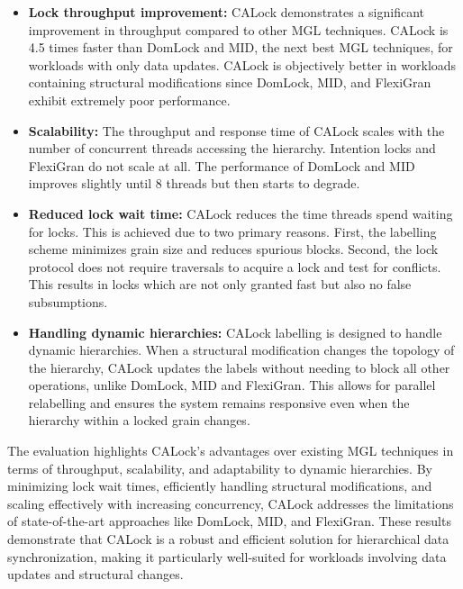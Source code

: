 \begin{itemize}
    \item \textbf{Lock throughput improvement:} CALock demonstrates a significant improvement in throughput compared to other MGL techniques. CALock is 4.5 times faster than DomLock and MID, the next best MGL techniques, for workloads with only data updates. CALock is objectively better in workloads containing structural modifications since DomLock, MID, and FlexiGran exhibit extremely poor performance. 

    \item \textbf{Scalability:} The throughput and response time of CALock scales with the number of concurrent threads accessing the hierarchy. Intention locks and FlexiGran do not scale at all. The performance of DomLock and MID improves slightly until 8 threads but then starts to degrade. 
    
    \item \textbf{Reduced lock wait time:} CALock reduces the time threads spend waiting for locks. This is achieved due to two primary reasons. First, the labelling scheme minimizes grain size and reduces spurious blocks. Second, the lock protocol does not require traversals to acquire a lock and test for conflicts. This results in locks which are not only granted fast but also no false subsumptions. 

    \item \textbf{Handling dynamic hierarchies:} CALock labelling is designed to handle dynamic hierarchies. When a structural modification changes the topology of the hierarchy, CALock updates the labels without needing to block all other operations, unlike DomLock, MID and FlexiGran. This allows for parallel relabelling and ensures the system remains responsive even when the hierarchy within a locked grain changes.  
\end{itemize}


The evaluation highlights CALock's advantages over existing MGL techniques in terms of throughput, scalability, and adaptability to dynamic hierarchies. By minimizing lock wait times, efficiently handling structural modifications, and scaling effectively with increasing concurrency, CALock addresses the limitations of state-of-the-art approaches like DomLock, MID, and FlexiGran. These results demonstrate that CALock is a robust and efficient solution for hierarchical data synchronization, making it particularly well-suited for workloads involving data updates and structural changes.


